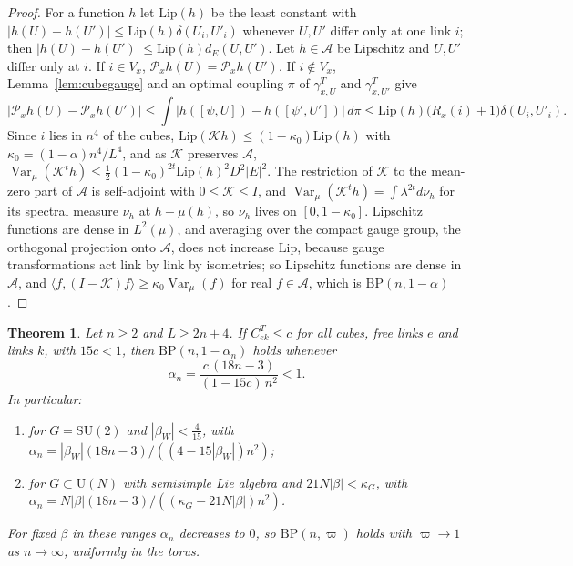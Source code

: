 \documentclass[11pt]{amsart}
\newtheorem{theorem}{Theorem}[section]
\theoremstyle{definition}
\theoremstyle{remark}
\numberwithin{equation}{section}
\newcommand{\SU}{\mathrm{SU}}
\newcommand{\U}{\mathrm{U}}
\newcommand{\Var}{\operatorname{Var}}
\newcommand{\ip}[2]{\langle #1,#2\rangle}
\newcommand{\BP}{\mathrm{BP}}
\begin{document}
\begin{proof}
For a function $h$ let $\mathrm{Lip}(h)$ be the least constant with
$|h(U)-h(U')|\le\mathrm{Lip}(h)\delta(U_i,U'_i)$ whenever $U,U'$ differ only at
one link $i$; then $|h(U)-h(U')|\le\mathrm{Lip}(h)d_E(U,U')$. Let $h\in\mathcal A$
be Lipschitz and $U,U'$ differ only at $i$. If $i\in V_x$,
$\mathcal P_xh(U)=\mathcal P_xh(U')$. If $i\notin V_x$, Lemma~\ref{lem:cubegauge}
and an optimal coupling $\pi$ of $\gamma^T_{x,U}$ and $\gamma^T_{x,U'}$ give
\[
|\mathcal P_xh(U)-\mathcal P_xh(U')|\le\int|h([\psi,U])-h([\psi',U'])|\,d\pi
\le\mathrm{Lip}(h)\bigl(R_x(i)+1\bigr)\delta(U_i,U'_i).
\]
Since $i$ lies in $n^4$ of the cubes, $\mathrm{Lip}(\mathcal Kh)\le(1-\kappa_0)
\mathrm{Lip}(h)$ with $\kappa_0=(1-\alpha)n^4/L^4$, and as $\mathcal K$
preserves $\mathcal A$, $\Var_\mu(\mathcal K^th)\le\frac12(1-\kappa_0)^{2t}
\mathrm{Lip}(h)^2D^2|E|^2$. The restriction of $\mathcal K$ to the mean-zero
part of $\mathcal A$ is self-adjoint with $0\le\mathcal K\le I$, and
$\Var_\mu(\mathcal K^th)=\int\lambda^{2t}d\nu_h$ for its spectral measure $\nu_h$
at $h-\mu(h)$, so $\nu_h$ lives on $[0,1-\kappa_0]$. Lipschitz functions are
dense in $L^2(\mu)$, and averaging over the compact gauge group, the
orthogonal projection onto $\mathcal A$, does not increase $\mathrm{Lip}$,
because gauge transformations act link by link by isometries; so Lipschitz
functions are dense in $\mathcal A$, and $\ip f{(I-\mathcal K)f}\ge\kappa_0
\Var_\mu(f)$ for real $f\in\mathcal A$, which is $\BP(n,1-\alpha)$.
\end{proof}

\begin{theorem}\label{thm:bpstrong}
Let $n\ge2$ and $L\ge2n+4$. If $C^T_{ek}\le c$ for all cubes, free links $e$
and links $k$, with $15c<1$, then $\BP(n,1-\alpha_n)$ holds whenever
\[
\alpha_n=\frac{c\,(18n-3)}{(1-15c)\,n^2}<1 .
\]
In particular:
\begin{enumerate}[label=\textup{(\roman*)},leftmargin=*]
\item for $G=\SU(2)$ and $|\beta_W|<\frac4{15}$, with $\alpha_n=|\beta_W|(18n-3)/
((4-15|\beta_W|)n^2)$;
\item for $G\subset\U(N)$ with semisimple Lie algebra and $21N|\beta|<\kappa_G$,
with $\alpha_n=N|\beta|(18n-3)/((\kappa_G-21N|\beta|)n^2)$.
\end{enumerate}
For fixed $\beta$ in these ranges $\alpha_n$ decreases to $0$, so $\BP(n,\varpi)$
holds with $\varpi\to1$ as $n\to\infty$, uniformly in the torus.
\end{theorem}
\end{document}
